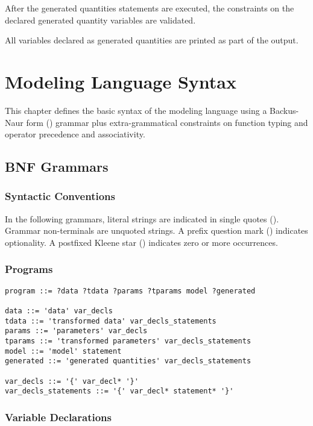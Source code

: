 After the generated quantities statements are executed, the constraints
on the declared generated quantity variables are validated.

All variables declared as generated quantities are printed as part of
the output. 

\chapter{Modeling Language Syntax}

\noindent
This chapter defines the basic syntax of the \Stan modeling language
using a Backus-Naur form (\BNF) grammar plus extra-grammatical
constraints on function typing and operator precedence and
associativity.


\section{BNF Grammars}

\subsection{Syntactic Conventions}

In the following \BNF grammars, literal strings are indicated in
single quotes ().  Grammar non-terminals are unquoted strings.
A prefix question mark ()  indicates optionality.  A postfixed
Kleene star (\code{*}) indicates zero or more occurrences.

\subsection{Programs}

{\small
\begin{Verbatim}[fontsize=\small]
program ::= ?data ?tdata ?params ?tparams model ?generated

data ::= 'data' var_decls
tdata ::= 'transformed data' var_decls_statements
params ::= 'parameters' var_decls
tparams ::= 'transformed parameters' var_decls_statements
model ::= 'model' statement
generated ::= 'generated quantities' var_decls_statements

var_decls ::= '{' var_decl* '}'
var_decls_statements ::= '{' var_decl* statement* '}'
\end{Verbatim}
}

\subsection{Variable Declarations}

